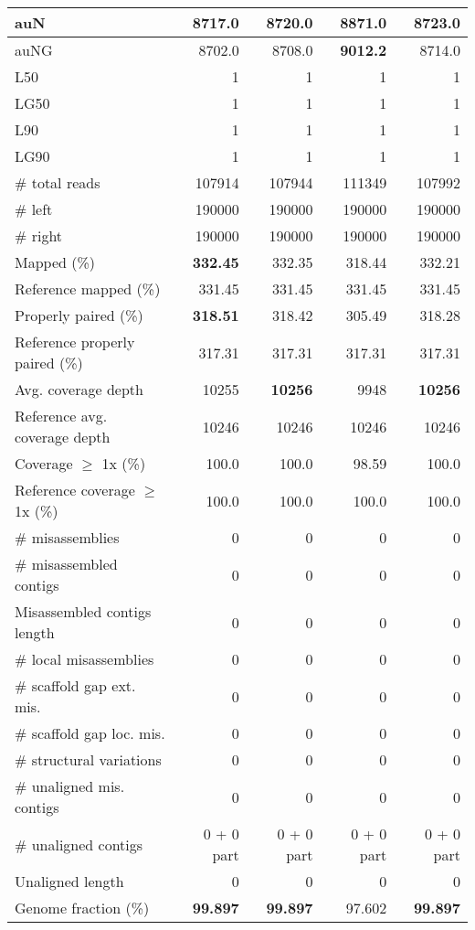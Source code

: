 \documentclass[12pt,a4paper]{article}
\begin{document}
\begin{table}[ht]
\begin{center}
\begin{tabular}{|l*{4}{|r}|}
auN & 8717.0 & 8720.0 & {\bf 8871.0} & 8723.0 \\ \hline
auNG & 8702.0 & 8708.0 & {\bf 9012.2} & 8714.0 \\ \hline
L50 & 1 & 1 & 1 & 1 \\ \hline
LG50 & 1 & 1 & 1 & 1 \\ \hline
L90 & 1 & 1 & 1 & 1 \\ \hline
LG90 & 1 & 1 & 1 & 1 \\ \hline
\# total reads & 107914 & 107944 & 111349 & 107992 \\ \hline
\# left & 190000 & 190000 & 190000 & 190000 \\ \hline
\# right & 190000 & 190000 & 190000 & 190000 \\ \hline
Mapped (\%) & {\bf 332.45} & 332.35 & 318.44 & 332.21 \\ \hline
Reference mapped (\%) & 331.45 & 331.45 & 331.45 & 331.45 \\ \hline
Properly paired (\%) & {\bf 318.51} & 318.42 & 305.49 & 318.28 \\ \hline
Reference properly paired (\%) & 317.31 & 317.31 & 317.31 & 317.31 \\ \hline
Avg. coverage depth & 10255 & {\bf 10256} & 9948 & {\bf 10256} \\ \hline
Reference avg. coverage depth & 10246 & 10246 & 10246 & 10246 \\ \hline
Coverage $\geq$ 1x (\%) & 100.0 & 100.0 & 98.59 & 100.0 \\ \hline
Reference coverage $\geq$ 1x (\%) & 100.0 & 100.0 & 100.0 & 100.0 \\ \hline
\# misassemblies & 0 & 0 & 0 & 0 \\ \hline
\# misassembled contigs & 0 & 0 & 0 & 0 \\ \hline
Misassembled contigs length & 0 & 0 & 0 & 0 \\ \hline
\# local misassemblies & 0 & 0 & 0 & 0 \\ \hline
\# scaffold gap ext. mis. & 0 & 0 & 0 & 0 \\ \hline
\# scaffold gap loc. mis. & 0 & 0 & 0 & 0 \\ \hline
\# structural variations & 0 & 0 & 0 & 0 \\ \hline
\# unaligned mis. contigs & 0 & 0 & 0 & 0 \\ \hline
\# unaligned contigs & 0 + 0 part & 0 + 0 part & 0 + 0 part & 0 + 0 part \\ \hline
Unaligned length & 0 & 0 & 0 & 0 \\ \hline
Genome fraction (\%) & {\bf 99.897} & {\bf 99.897} & 97.602 & {\bf 99.897} \\ \hline

\end{tabular}
\end{center}
\end{table}
\end{document}
